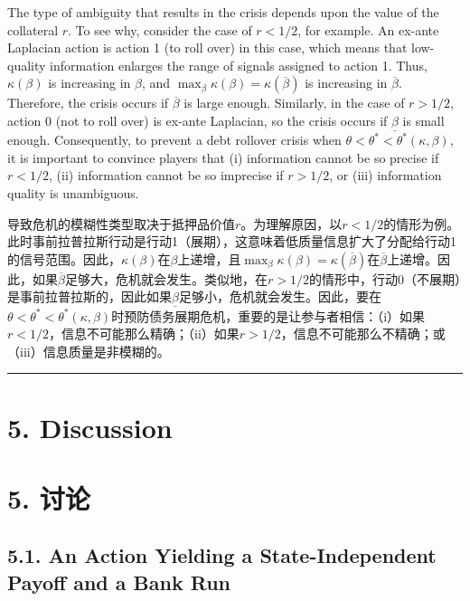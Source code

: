 \documentclass[12pt,a4paper]{article}
\newenvironment{original}
  {\par\medskip\noindent\color{black}\ignorespaces}
  {\par\medskip}
\newenvironment{translation}
  {\par\noindent\color{darkblue}\ignorespaces}
  {\par\medskip\noindent\hrule\par\medskip}
\theoremstyle{definition}
\theoremstyle{remark}
\begin{document}
\begin{original}
The type of ambiguity that results in the crisis depends upon the value of the collateral $r$. To see why, consider the case of $r < 1/2$, for example. An ex-ante Laplacian action is action 1 (to roll over) in this case, which means that low-quality information enlarges the range of signals assigned to action 1. Thus, $\kappa(\beta)$ is increasing in $\beta$, and $\max_{\beta} \kappa(\beta) = \kappa(\overline{\beta})$ is increasing in $\overline{\beta}$. Therefore, the crisis occurs if $\overline{\beta}$ is large enough. Similarly, in the case of $r > 1/2$, action 0 (not to roll over) is ex-ante Laplacian, so the crisis occurs if $\underline{\beta}$ is small enough. Consequently, to prevent a debt rollover crisis when $\theta < \theta^* < \theta^*(\kappa, \beta)$, it is important to convince players that (i) information cannot be so precise if $r < 1/2$, (ii) information cannot be so imprecise if $r > 1/2$, or (iii) information quality is unambiguous.
\end{original}
\begin{translation}
导致危机的模糊性类型取决于抵押品价值$r$。为理解原因，以$r < 1/2$的情形为例。此时事前拉普拉斯行动是行动1（展期），这意味着低质量信息扩大了分配给行动1的信号范围。因此，$\kappa(\beta)$在$\beta$上递增，且$\max_{\beta} \kappa(\beta) = \kappa(\overline{\beta})$在$\overline{\beta}$上递增。因此，如果$\overline{\beta}$足够大，危机就会发生。类似地，在$r > 1/2$的情形中，行动0（不展期）是事前拉普拉斯的，因此如果$\underline{\beta}$足够小，危机就会发生。因此，要在$\theta < \theta^* < \theta^*(\kappa, \beta)$时预防债务展期危机，重要的是让参与者相信：（i）如果$r < 1/2$，信息不可能那么精确；（ii）如果$r > 1/2$，信息不可能那么不精确；或（iii）信息质量是非模糊的。
\end{translation}

\section{5. Discussion}
\section*{\color{darkblue}5. 讨论}

\subsection{5.1. An Action Yielding a State-Independent Payoff and a Bank Run}
\end{document}
